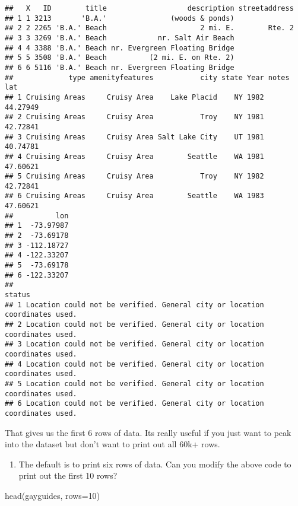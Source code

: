 \documentclass[
]{article}
\newenvironment{Shaded}{\begin{snugshade}}{\end{snugshade}}
\newcommand{\AttributeTok}[1]{\textcolor[rgb]{0.77,0.63,0.00}{#1}}
\newcommand{\DecValTok}[1]{\textcolor[rgb]{0.00,0.00,0.81}{#1}}
\newcommand{\FunctionTok}[1]{\textcolor[rgb]{0.00,0.00,0.00}{#1}}
\newcommand{\NormalTok}[1]{#1}
\providecommand{\tightlist}{%
  \setlength{\itemsep}{0pt}\setlength{\parskip}{0pt}}
\begin{document}
\begin{verbatim}
##   X   ID        title                   description streetaddress
## 1 1 3213       'B.A.'               (woods & ponds)              
## 2 2 2265 'B.A.' Beach                      2 mi. E.        Rte. 2
## 3 3 3269 'B.A.' Beach            nr. Salt Air Beach              
## 4 4 3388 'B.A.' Beach nr. Evergreen Floating Bridge              
## 5 5 3508 'B.A.' Beach          (2 mi. E. on Rte. 2)              
## 6 6 5116 'B.A.' Beach nr. Evergreen Floating Bridge              
##             type amenityfeatures           city state Year notes      lat
## 1 Cruising Areas     Cruisy Area    Lake Placid    NY 1982       44.27949
## 2 Cruising Areas     Cruisy Area           Troy    NY 1981       42.72841
## 3 Cruising Areas     Cruisy Area Salt Lake City    UT 1981       40.74781
## 4 Cruising Areas     Cruisy Area        Seattle    WA 1981       47.60621
## 5 Cruising Areas     Cruisy Area           Troy    NY 1982       42.72841
## 6 Cruising Areas     Cruisy Area        Seattle    WA 1983       47.60621
##          lon
## 1  -73.97987
## 2  -73.69178
## 3 -112.18727
## 4 -122.33207
## 5  -73.69178
## 6 -122.33207
##                                                                       status
## 1 Location could not be verified. General city or location coordinates used.
## 2 Location could not be verified. General city or location coordinates used.
## 3 Location could not be verified. General city or location coordinates used.
## 4 Location could not be verified. General city or location coordinates used.
## 5 Location could not be verified. General city or location coordinates used.
## 6 Location could not be verified. General city or location coordinates used.
\end{verbatim}

That gives us the first 6 rows of data. Its really useful if you just
want to peak into the dataset but don't want to print out all 60k+ rows.

\begin{enumerate}
\def\labelenumi{(\arabic{enumi})}
\setcounter{enumi}{19}
\tightlist
\item
  The default is to print six rows of data. Can you modify the above
  code to print out the first 10 rows?
\end{enumerate}

\begin{Shaded}
\begin{Highlighting}[]
\FunctionTok{head}\NormalTok{(gayguides, }\AttributeTok{rows=}\DecValTok{10}\NormalTok{)}
\end{Highlighting}
\end{Shaded}
\end{document}
